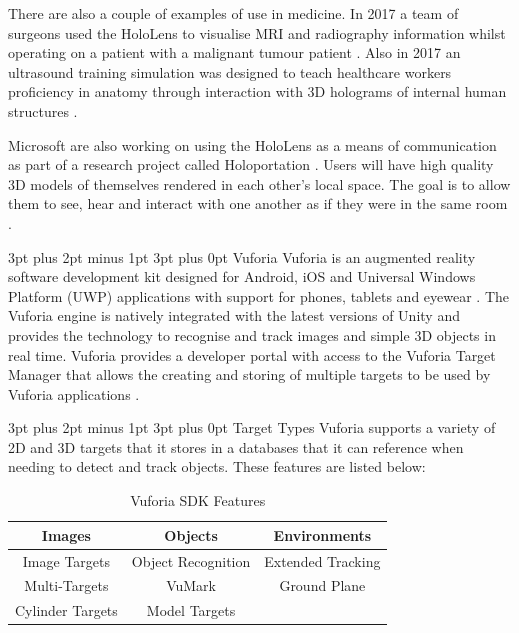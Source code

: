 \documentclass[12pt,a4paper,oneside]{article}
\makeatletter
\renewcommand\subsubsection{\@startsection {subsubsection}{1}{0mm} %
	                           {3pt plus 2pt minus 1pt} %
	                           {3pt plus 0pt} %
	                           {\normalfont\bfseries}}
\renewcommand\subsection{\@startsection {subsection}{1}{0mm} %
                               {3pt plus 2pt minus 1pt} %
                               {3pt plus 0pt} %
                               {\large\bfseries}}
\makeatother
\begin{document}
There are also a couple of examples of use in medicine. In 2017 a team of surgeons used the HoloLens to visualise MRI and radiography information whilst operating on a patient with a malignant tumour patient \cite{bernardo17, 3ders17}. Also in 2017 an ultrasound training simulation was designed to teach healthcare workers proficiency in anatomy through interaction with 3D holograms of internal human structures \cite{lynn17, mahmood17}.

Microsoft are also working on using the HoloLens as a means of communication as part of a research project called Holoportation \cite{cutler17}. Users will have high quality 3D models of themselves rendered in each other's local space. The goal is to allow them to see, hear and interact with one another as if they were in the same room \cite{orts16}.

\subsection{Vuforia}
Vuforia is an augmented reality software development kit designed for Android, iOS and Universal Windows Platform (UWP) applications with support for phones, tablets and eyewear \cite{vuforia, vuforiaeyewear}. The Vuforia engine is natively integrated with the latest versions of Unity and provides the technology to recognise and track images and simple 3D objects in real time. Vuforia provides a developer portal with access to the Vuforia Target Manager that allows the creating and storing of multiple targets to be used by Vuforia applications \cite{vuforiatargetmanager}.

\subsubsection{Target Types}
Vuforia supports a variety of 2D and 3D targets that it stores in a databases that it can reference when needing to detect and track objects. These features are listed below:

\begin{table}[!h]
	\renewcommand{\arraystretch}{1.3}
	\caption{Vuforia SDK Features}
	\label{hardware}
	\centering
	\begin{tabular}{c|c|c}
		\toprule
		Images & Objects & Environments \\ \midrule
		Image Targets & Object Recognition & Extended Tracking \\
		Multi-Targets & VuMark & Ground Plane \\
		Cylinder Targets & Model Targets &  \\ \bottomrule
	\end{tabular}
\end{table}
\end{document}

